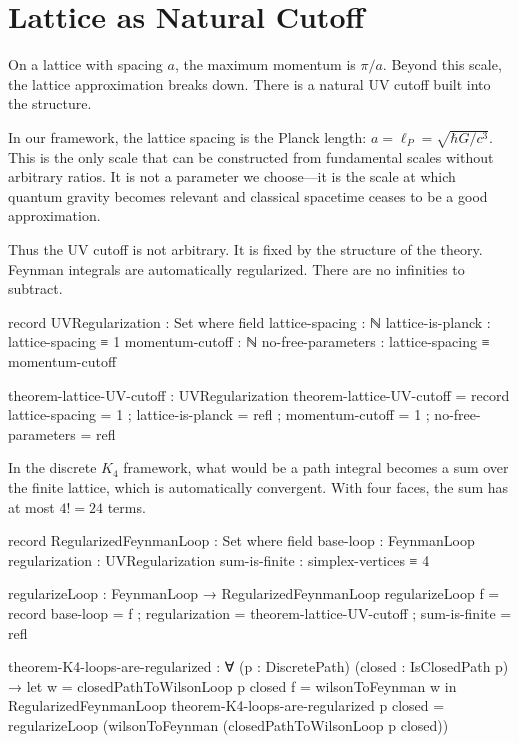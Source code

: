 \documentclass[11pt,a4paper]{book}
\begin{document}
\section{Lattice as Natural Cutoff}

On a lattice with spacing $a$, the maximum momentum is $\pi/a$. Beyond this scale, the 
lattice approximation breaks down. There is a natural UV cutoff built into the structure.

In our framework, the lattice spacing is the Planck length: $a = \ell_P = \sqrt{\hbar G / c^3}$. 
This is the only scale that can be constructed from fundamental scales without arbitrary 
ratios. It is not a parameter we choose—it is the scale at which quantum gravity becomes 
relevant and classical spacetime ceases to be a good approximation.

Thus the UV cutoff is not arbitrary. It is fixed by the structure of the theory. Feynman 
integrals are automatically regularized. There are no infinities to subtract.

\begin{code}
record UVRegularization : Set where
  field
    lattice-spacing : ℕ
    lattice-is-planck : lattice-spacing ≡ 1
    momentum-cutoff : ℕ
    no-free-parameters : lattice-spacing ≡ momentum-cutoff

theorem-lattice-UV-cutoff : UVRegularization
theorem-lattice-UV-cutoff = record
  { lattice-spacing = 1
  ; lattice-is-planck = refl
  ; momentum-cutoff = 1
  ; no-free-parameters = refl
  }
\end{code}

In the discrete $K_4$ framework, what would be a path integral becomes a sum over the finite lattice, which is automatically convergent. With four faces, the sum has at most $4! = 24$ terms.

\begin{code}
record RegularizedFeynmanLoop : Set where
  field
    base-loop       : FeynmanLoop
    regularization  : UVRegularization
    sum-is-finite   : simplex-vertices ≡ 4

regularizeLoop : FeynmanLoop → RegularizedFeynmanLoop
regularizeLoop f = record
  { base-loop      = f
  ; regularization = theorem-lattice-UV-cutoff
  ; sum-is-finite  = refl
  }

theorem-K4-loops-are-regularized : ∀ (p : DiscretePath) (closed : IsClosedPath p) →
  let w = closedPathToWilsonLoop p closed
      f = wilsonToFeynman w
  in RegularizedFeynmanLoop
theorem-K4-loops-are-regularized p closed = 
  regularizeLoop (wilsonToFeynman (closedPathToWilsonLoop p closed))
\end{code}
\end{document}
